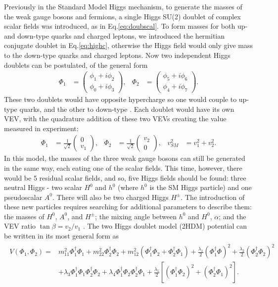 \documentclass[a4paper,12pt]{article}
\begin{document}
Previously in the Standard Model Higgs mechanism, to generate the masses of the weak gauge bosons and fermions, a single Higgs SU(2) doublet of complex scalar fields was introduced, as in Eq.\eqref{eq:doubscal}.
To form masses for both up- and down-type quarks and charged leptons, we introduced the hermitian conjugate doublet in Eq.\eqref{eq:highc}, otherwise the Higgs field would only give mass to the down-type quarks and charged leptons. 
Now two independent Higgs doublets can be postulated, of the general form
\begin{align}
    \label{eq:gdbl}
    \Phi_1 &= \begin{pmatrix} \phi_1 + i\phi_2 \\ \phi_0 + i\phi_3\end{pmatrix}, & \Phi_2 &= \begin{pmatrix} \phi_5+i\phi_6\\\phi_4+i\phi_7\end{pmatrix}.
\end{align}
These two doublets would have opposite hypercharge so one would couple to up-type quarks, and the other to down-type \cite{branco}. 
Each doublet would have its own VEV, with the quadrature addition of these two VEVs creating the value measured in experiment:
\begin{align}
    \label{eq:dbldbl}
    \Phi_1 &= \frac{1}{\sqrt{2}}\begin{pmatrix}0\\v_1\end{pmatrix}, & \Phi_2 &= \frac{1}{\sqrt{2}}\begin{pmatrix}v_2\\0\end{pmatrix}, & v_{SM}^2 &= v_1^2 + v_2^2.
\end{align}
In this model, the masses of the three weak gauge bosons can still be generated in the same way, each eating one of the scalar fields. 
This time, however, there would be 5 residual scalar fields, and so, five Higgs fields should be found: three neutral Higgs - two scalar $H^0$ and $h^0$ (where $h^0$ is the SM Higgs particle) and one pseudoscalar $A^0$.
There will also be two charged Higgs $H^\pm$.
The introduction of these new particles requires searching for additional parameters to describe them: the masses of $H^0$, $A^0$, and $H^\pm$; the mixing angle between $h^0$ and $H^0$, $\alpha$; and the VEV ratio $\tan\beta=v_2/v_1$ \cite{hunter}.
The two Higgs doublet model (2HDM) potential can be written in its most general form as
\begin{align}
    \label{eq:HDMpot}
    \begin{split}
        V(\Phi_1,\Phi_2) =& m_{11}^2\Phi_1^\dagger\Phi_1 + m_{22}^2\Phi_2^\dagger\Phi_2 + m_{12}^2(\Phi_1^\dagger\Phi_2+\Phi_2^\dagger\Phi_1) + \frac{\lambda_1}{2}(\Phi_1^\dagger\Phi)^2 + \frac{\lambda_2}{2}(\Phi_2^\dagger\Phi_2)^2 \\
                                                        &+ \lambda_3\Phi_1^\dagger\Phi_1\Phi_2^\dagger\Phi_2 + \lambda_4\Phi_1^\dagger\Phi_2\Phi_2^\dagger\Phi_1 + \frac{\lambda_5}{2}\left[(\Phi_1^\dagger\Phi_2)^2+(\Phi_2^\dagger\Phi_1)^2\right].
    \end{split}
\end{align}
\end{document}
